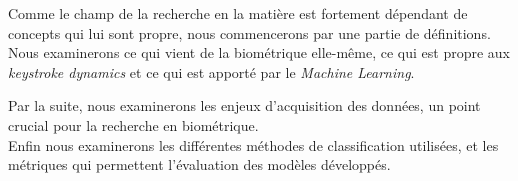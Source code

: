 Comme le champ de la recherche en la matière est fortement dépendant de concepts qui lui sont propre, nous commencerons par une partie de définitions. Nous examinerons ce qui vient de la biométrique elle-même, ce qui est propre aux \textit{keystroke dynamics} et ce qui est apporté par le \textit{Machine Learning}.

Par la suite, nous examinerons les enjeux d'acquisition des données, un point crucial pour la recherche en biométrique. \\

Enfin nous examinerons les différentes méthodes de classification utilisées, et les métriques qui permettent l'évaluation des modèles développés.